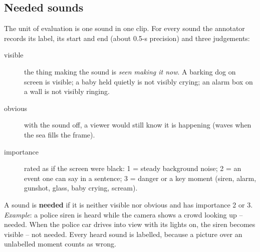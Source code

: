 \subsection{Needed sounds}\label{sec:needed}
The unit of evaluation is one sound in one clip. For every sound the annotator records its label, its start and end
(about 0.5-s precision) and three judgements:
\begin{description}
  \item[visible] the thing making the sound is \emph{seen making it now}. A barking dog on screen is visible; a baby
        held quietly is not visibly crying; an alarm box on a wall is not visibly ringing.
  \item[obvious] with the sound off, a viewer would still know it is happening (waves when the sea fills the frame).
  \item[importance] rated as if the screen were black: 1 = steady background noise; 2 = an event one can say in a
        sentence; 3 = danger or a key moment (siren, alarm, gunshot, glass, baby crying, scream).
\end{description}
A sound is \textbf{needed} if it is neither visible nor obvious and has importance 2 or 3. \emph{Example}: a police
siren is heard while the camera shows a crowd looking up -- needed. When the police car drives into view with its
lights on, the siren becomes visible -- not needed. Every heard sound is labelled, because a picture over an unlabelled
moment counts as wrong.

